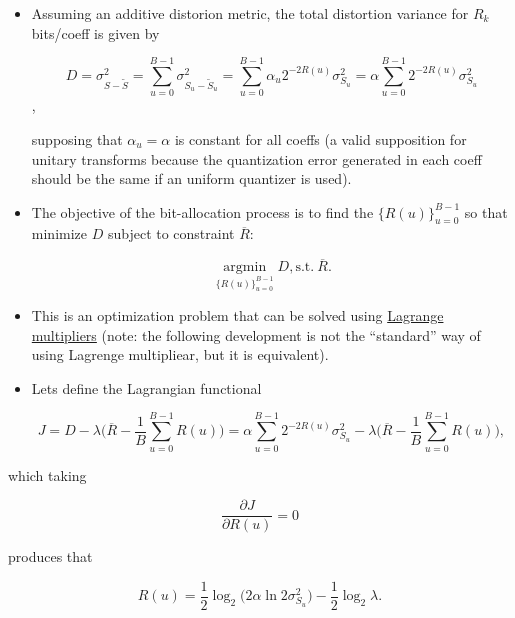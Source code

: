 \begin{itemize}
\item
  Assuming an additive distorion metric, the total distortion variance
  for \(R_k\) bits/coeff is given by

  \begin{equation}
    D = \sigma_{S-\tilde{S}}^2 = \sum_{u=0}^{B-1} \sigma_{S_u-\tilde{S}_u}^2 = \sum_{u=0}^{B-1}\alpha_u 2^{-2R(u)}\sigma_{S_u}^2 = \alpha\sum_{u=0}^{B-1}2^{-2R(u)}\sigma_{S_u}^2
    \tag{$D$}
  \end{equation},

  supposing that \(\alpha_u = \alpha\) is constant for all coeffs (a
  valid supposition for unitary transforms because the quantization
  error generated in each coeff should be the same if an uniform
  quantizer is used).
\item
  The objective of the bit-allocation process is to find the
  \(\{R(u)\}_{u=0}^{B-1}\) so that minimize \(D\) subject to constraint
  \(\overline{R}\):

  \begin{equation}
    \underset{\{R(u)\}_{u=0}^{B-1}}{\operatorname{arg min}} D, \text{s.t.}~{\overline{R}}. 
  \end{equation}
\item
  This is an optimization problem that can be solved using
  \href{https://en.wikipedia.org/wiki/Lagrange_multiplier}{Lagrange
  multipliers} (note: the following development is not the ``standard''
  way of using Lagrenge multipliear, but it is equivalent).
\item
  Lets define the Lagrangian functional

  \begin{equation}
    J = D - \lambda\Big( \overline{R} - \frac{1}{B}\sum_{u=0}^{B-1}R(u) \Big)= \alpha \sum_{u=0}^{B-1} 2^{-2R(u)}\sigma_{S_u}^2 - \lambda \Big( \overline{R} - \frac{1}{B}\sum_{u=0}^{B-1}R(u) \Big),
  \end{equation}
\end{itemize}

which taking

\begin{equation}
    \frac{\partial J}{\partial R(u)} = 0
  \end{equation}

produces that

\begin{equation}
    R(u) = \frac{1}{2}\log_2\big( 2\alpha\ln 2\sigma_{S_u}^2 \big) - \frac{1}{2}\log_2\lambda.
    \tag{$R(u)$}
  \end{equation}

